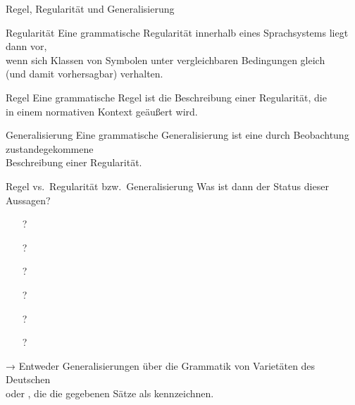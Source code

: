 \begin{frame}
  {Regel, Regularität und Generalisierung}
  \onslide<+->
  \onslide<+->
  \begin{block}{Regularität}
    Eine grammatische Regularität innerhalb eines Sprachsystems liegt dann vor,\\
    wenn sich Klassen von Symbolen unter vergleichbaren Bedingungen gleich\\
    (und damit vorhersagbar) verhalten.
  \end{block}

  \onslide<+->
  \Halbzeile

  \begin{block}{Regel}
    Eine grammatische Regel ist die Beschreibung einer Regularität, die\\
    in einem normativen Kontext geäußert wird.
  \end{block}

  \onslide<+->
  \Halbzeile
  
  \begin{block}{Generalisierung}
    Eine grammatische Generalisierung ist eine durch Beobachtung zustandegekommene\\
    Beschreibung einer Regularität.
  \end{block}
\end{frame}

\begin{frame}
  {Regel vs.\ Regularität bzw.\ Generalisierung}
  \onslide<+->
  \onslide<+->
  Was ist dann der Status dieser Aussagen?\\
  \Zeile 
  \onslide<+->
  \begin{itemize}
    \item[?] 
    \item[?] 
    \item[?] 
    \item[?] 
    \item[?] 
    \item[?] 
  \end{itemize}
  \Zeile
  \onslide<+->
  → Entweder \alert{Generalisierungen} über die Grammatik von \alert{Varietäten des Deutschen} \\
  oder , die die gegebenen Sätze als  kennzeichnen.
\end{frame}

